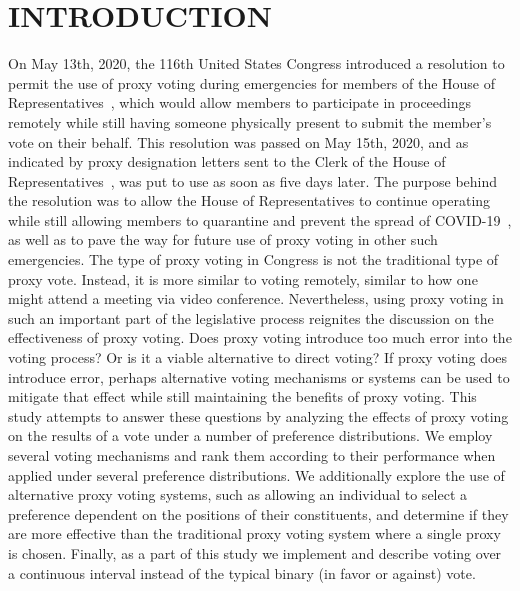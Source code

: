 %
%

\chapter{INTRODUCTION}\label{ch:introduction}
\thispagestyle{empty}
On May 13th, 2020, the 116th United States Congress introduced a resolution
to permit the use of proxy voting during emergencies for members of the House of
Representatives~\cite{Congress.gov2020}, which would allow members to participate in
proceedings remotely while still having someone physically present to submit the
member's vote on their behalf.
This resolution was passed on May 15th, 2020, and as indicated by proxy designation
letters sent to the Clerk of the House of Representatives~\cite{Clerk.House.gov2022},
was put to use as soon as five days later.
The purpose behind the resolution was to allow the House of Representatives
to continue operating while still allowing members to quarantine and prevent the
spread of COVID-19~\cite{Congress.gov2020}, as well as to pave the way for future use
of proxy voting in other such emergencies.
The type of proxy voting in Congress is not the traditional type of proxy vote.
Instead, it is more similar to voting remotely, similar to how one might attend a
meeting via video conference.
Nevertheless, using proxy voting in such an important part of the legislative process
reignites the discussion on the effectiveness of proxy voting.
Does proxy voting introduce too much error into the voting process?
Or is it a viable alternative to direct voting?
If proxy voting does introduce error, perhaps alternative voting mechanisms or systems
can be used to mitigate that effect while still maintaining the benefits of proxy
voting.
This study attempts to answer these questions by analyzing the effects of proxy
voting on the results of a vote under a number of preference distributions.
We employ several voting mechanisms and rank them according to their performance when
applied under several preference distributions.
We additionally explore the use of alternative proxy voting systems, such as
allowing an individual to select a preference dependent on the positions of their
constituents, and determine if they are more effective than the traditional proxy
voting system where a single proxy is chosen.
Finally, as a part of this study we implement and describe voting over a continuous
interval instead of the typical binary (in favor or against) vote.

